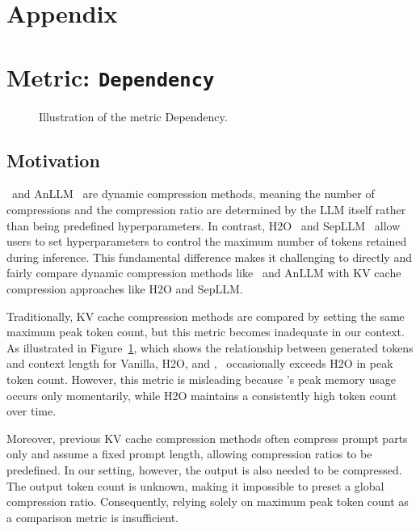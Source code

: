 
\clearpage
\appendix

\section*{Appendix}
\section{Metric: \texttt{Dependency}}
\label{sec:app:metric}
\begin{figure}[!htbp] %
    \centering
    \caption{Illustration of the metric Dependency.}
    \label{fig:app:metric}
\end{figure} 
\subsection{Motivation}
\ours~and AnLLM~\citep{acl24_anllm} are dynamic compression methods, meaning the number of compressions and the compression ratio are determined by the LLM itself rather than being predefined hyperparameters. 
In contrast, H2O~\citep{nips23_h2o} and SepLLM~\citep{arxiv24_sepllm} allow users to set hyperparameters to control the maximum number of tokens retained during inference. 
This fundamental difference makes it challenging to directly and fairly compare dynamic compression methods like \ours~and AnLLM with KV cache compression approaches like H2O and SepLLM.  

Traditionally, KV cache compression methods are compared by setting the same maximum peak token count, but this metric becomes inadequate in our context. 
As illustrated in Figure~\ref{fig:app:metric}, which shows the relationship between generated tokens and context length for Vanilla, H2O, and \ours, 
\ours~occasionally exceeds H2O in peak token count. 
However, this metric is misleading because \ours's peak memory usage occurs only momentarily, while H2O maintains a consistently high token count over time.  

Moreover, previous KV cache compression methods often compress prompt parts only and assume a fixed prompt length, allowing compression ratios to be predefined. 
In our setting, however, the output is also needed to be compressed.
The output token count is unknown, making it impossible to preset a global compression ratio. 
Consequently, relying solely on maximum peak token count as a comparison metric is insufficient.  

